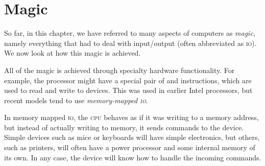 \section{Magic}

So far, in this chapter, we have referred to many aspects of computers as
\textit{magic}, namely everything that had to deal with input/output (often
abbreviated as \textsc{io}). We now look at how this magic is achieved.

All of the magic is achieved through specialty hardware functionality. For
example, the processor might have a special pair of  and
 instructions, which are used to read and write to devices.
This was used in earlier Intel processors, but recent models tend to use
\emph{memory-mapped \textsc{io}}.

In memory mapped \textsc{io}, the \textsc{cpu} behaves as if it was writing to
a memory address, but instead of actually writing to memory, it sends commands
to the device. Simple devices such as mice or keyboards will have simple
electronics, but others, such as printers, will often have a power processor
and some internal memory of its own. In any case, the device will know how to
handle the incoming commands.


